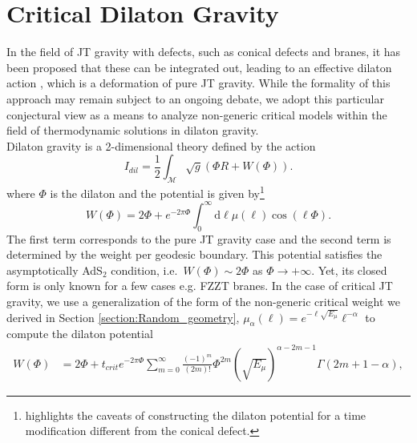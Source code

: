 \documentclass[a4paper,11pt]{article}
\newcommand{\rmd}{\mathrm{d}}
\begin{document}
\section{Critical Dilaton Gravity}\label{Section_Dilaton_gravity}
In the field of JT gravity with defects, such as conical defects and branes,  it has been proposed that these can be integrated out, leading to an effective dilaton action \cite{Witten:2020wvy, Turi:2020ale, Gao:2021uro}, which is a deformation of pure JT gravity. While the formality of this approach may remain subject to an ongoing debate, we adopt this particular conjectural view as a means to analyze non-generic critical models within the field of thermodynamic solutions in dilaton gravity.\\
Dilaton gravity is a 2-dimensional theory defined by the action 
\begin{equation}
    I_{dil}=\frac{1}{2}\int_{\mathcal{M}}\sqrt{g}(\Phi R+W(\Phi)).\label{eq:dilaton_action}
\end{equation}
where $\Phi$ is the dilaton and the potential is given by\footnote{\cite{Okuyama:2021FZZT} highlights the caveats of constructing the dilaton potential for a time modification different from the conical defect.}
    \begin{equation}    W(\Phi)=2\Phi+e^{-2\pi\Phi}\int_0^\infty \rmd \ell \mu(\ell)\cos\left(\ell \Phi\right).\label{eq:dilaton_pot_general}
    \end{equation}
The first term corresponds to the pure JT gravity case and the second term is determined by the weight per geodesic boundary. This potential satisfies the asymptotically AdS$_2$ condition, i.e.\ $W(\Phi)\sim 2\Phi$ as $\Phi\rightarrow +\infty$. Yet, its closed form  is only known for a few cases e.g. FZZT branes. In the case of critical JT gravity, we use a generalization of the form of the non-generic critical weight we derived in Section \ref{section:Random_geometry}, $\mu_{\alpha}(\ell)= e^{-\ell \sqrt{E_\mu}}\ell^{-\alpha}$ to compute 
the dilaton potential
\begin{align}
    W(\Phi) &=2\Phi
    +t_{crit} e^{-2\pi\Phi}\sum_{m=0}^\infty \frac{(-1)^m}{(2m)!}\Phi^{2m} \left(\sqrt{E_\mu}\right)^{\alpha-2m-1}\Gamma\left(2m+1-\alpha\right),
    \label{eq:dilaton_pot_critical_particular}
\end{align}
\end{document}
